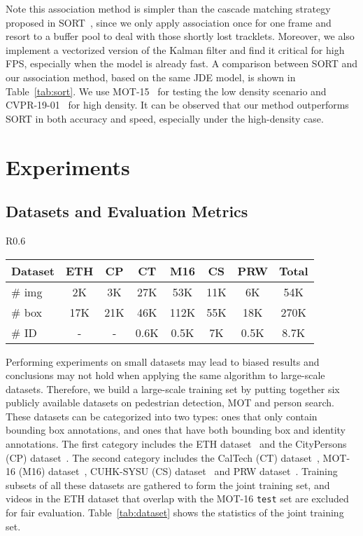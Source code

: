 \documentclass[runningheads]{llncs}
\begin{document}
Note this association method is simpler than the cascade matching strategy proposed in SORT~\cite{sort}, since we only apply association once for one frame and resort to a buffer pool to deal with those shortly lost tracklets. Moreover, we also implement a vectorized version of the Kalman filter and find it critical for high FPS, especially when the model is already fast. A comparison between SORT and our association method, based on the same JDE model, is shown in Table~\ref{tab:sort}. We use MOT-15~\cite{mot16} for testing the low density scenario and CVPR-19-01~\cite{mot19} for high density. It can be observed that our method outperforms SORT in both accuracy and speed, especially under the high-density case.





\section{Experiments}
\subsection{Datasets and Evaluation Metrics}


\begin{wraptable}{R}{0.6\linewidth}

    \centering
    \begin{tabular}{l|ccccccc}
    \toprule
     Dataset& ETH & CP & CT & M16 & CS & PRW & Total \\
     \midrule
     $\#$ img & 2K & 3K& 27K& 53K& 11K& 6K& 54K\\
     $\#$ box & 17K& 21K& 46K& 112K& 55K& 18K& 270K\\
     $\#$ ID & -& - & 0.6K & 0.5K& 7K& 0.5K& 8.7K\\
     \bottomrule
\end{tabular}
    \caption{Statistics of the joint training set.}
    \label{tab:dataset}
\end{wraptable}

Performing experiments on small datasets may lead to biased results and conclusions may not hold when applying the same algorithm to large-scale datasets. 
Therefore, we build a large-scale training set by putting together six publicly available  datasets on pedestrian detection, MOT and person search. These datasets can be categorized into two types: ones that only contain bounding box annotations, and ones that have both bounding box and identity annotations. The first category includes the ETH dataset~\cite{eth} and the CityPersons (CP) dataset~\cite{citypersons}. The second category includes the CalTech (CT) dataset~\cite{caltech}, MOT-16 (M16) dataset~\cite{mot16}, CUHK-SYSU (CS) dataset~\cite{personsearch} and PRW dataset~\cite{prw}. Training subsets of all these datasets are gathered to form the joint training set, and videos in the ETH dataset that overlap with the MOT-16 \texttt{test} set are excluded for fair evaluation. 
Table~\ref{tab:dataset} shows the statistics of the joint training set.
\end{document}
